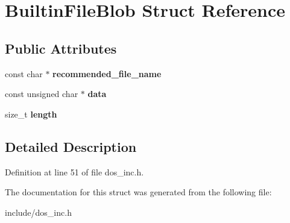 \hypertarget{structBuiltinFileBlob}{\section{Builtin\-File\-Blob Struct Reference}
\label{structBuiltinFileBlob}
}
\subsection*{Public Attributes}
\begin{DoxyCompactItemize}
\item 
\hypertarget{structBuiltinFileBlob_a27257011b2929bc931106342ddf8caed}{const char $\ast$ {\bfseries recommended\-\_\-file\-\_\-name}}\label{structBuiltinFileBlob_a27257011b2929bc931106342ddf8caed}

\item 
\hypertarget{structBuiltinFileBlob_a2c78c750b9f6453cd12af48ab7d8c4be}{const unsigned char $\ast$ {\bfseries data}}\label{structBuiltinFileBlob_a2c78c750b9f6453cd12af48ab7d8c4be}

\item 
\hypertarget{structBuiltinFileBlob_add502835899f037bce20bc3ce28b7f30}{size\-\_\-t {\bfseries length}}\label{structBuiltinFileBlob_add502835899f037bce20bc3ce28b7f30}

\end{DoxyCompactItemize}


\subsection{Detailed Description}


Definition at line 51 of file dos\-\_\-inc.\-h.



The documentation for this struct was generated from the following file\-:\begin{DoxyCompactItemize}
\item 
include/dos\-\_\-inc.\-h\end{DoxyCompactItemize}
